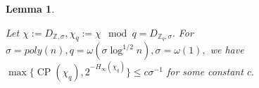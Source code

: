 \documentclass[11pt]{article}
\newcommand{\poly}[2]{{#1}^{<#2}[x]}
\newcommand{\Z}{\mathbb{Z}}
\newcommand{\sample}{\leftarrow}
\newtheorem{lemma}{Lemma}[section]
\DeclareMathOperator{\cp}{CP}
\begin{document}
\begin{lemma} \label{lemma:clmpmf}

Let $\chi :=  D_{\Z, \sigma}, \chi_q := \chi \!\mod q = D_{\Z_q, \sigma}.$
For $\sigma =poly(n), q = \omega(\sigma \log^{1/2} n ) , \sigma = \omega(1),$ we have $\max \{ \cp(\chi_q), 2^{-H_{\infty}(\chi_q)} \} \leq c \sigma^{-1}$ for some constant $c.$  %
\end{lemma}
\end{document}
